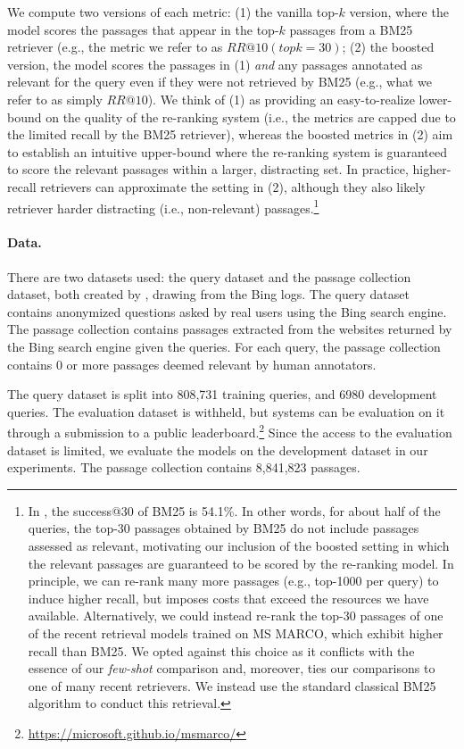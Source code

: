 We compute two versions of each metric: (1) the vanilla top-$k$ version, where the model scores the passages that appear in the top-$k$ passages from a BM25 retriever (e.g., the metric we refer to as $RR@10 (topk=30)$; (2) the boosted version, the model scores the passages in (1) \textit{and} any passages annotated as relevant for the query even if they were not retrieved by BM25 (e.g., what we refer to as simply $RR@10$). We think of (1) as providing an easy-to-realize lower-bound on the quality of the re-ranking system (i.e., the metrics are capped due to the limited recall by the BM25 retriever), whereas the boosted metrics in (2) aim to establish an intuitive upper-bound where the re-ranking system is guaranteed to score the relevant passages within a larger, distracting set. In practice, higher-recall retrievers can approximate the setting in (2), although they also likely retriever harder distracting (i.e., non-relevant) passages.\footnote{In \msmarcoregular, the success@30 of BM25 is 54.1\%. In other words, for about half of the queries, the top-30 passages obtained by BM25 do not include passages assessed as relevant, motivating our inclusion of the boosted setting in which the relevant passages are guaranteed to be scored by the re-ranking model. In principle, we can re-rank many more passages (e.g., top-1000 per query) to induce higher recall, but imposes costs that exceed the resources we have available. Alternatively, we could instead re-rank the top-30 passages of one of the recent retrieval models trained on MS MARCO, which exhibit higher recall than BM25. We opted against this choice as it conflicts with the essence of our \textit{few-shot} comparison and, moreover, ties our comparisons to one of many recent retrievers. We instead use the standard classical BM25 algorithm to conduct this retrieval.}

\paragraph{Data.}
There are two datasets used: the query dataset and the passage collection dataset, both created by \citet{nguyen2016ms}, drawing from the Bing logs.
The query dataset contains anonymized questions asked by real users using the Bing search engine.
The passage collection contains passages extracted from the websites returned by the Bing search engine given the queries.
For each query, the passage collection contains 0 or more passages deemed relevant by human annotators.

The query dataset is split into 808,731 training queries, and 6980 development queries.
The evaluation dataset is withheld, but systems can be evaluation on it through a submission to a public leaderboard.\footnote{\url{https://microsoft.github.io/msmarco/}}
Since the access to the evaluation dataset is limited, we evaluate the models on the development dataset in our experiments.
The passage collection contains 8,841,823 passages.

